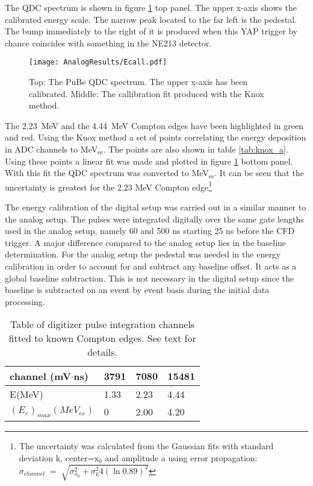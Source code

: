 \documentclass[main.tex]{subfiles}
\begin{document}
The QDC spectrum is shown in figure \ref{fig:qdc_a} top panel. The upper x-axis shows the calibrated energy scale. The narrow peak located to the far left is the pedestal. The bump immediately to the right of it is produced when this YAP trigger by chance coincides with something in the NE213 detector.
\begin{figure}[ht!]
    \centering
        \texttt{[image: AnalogResults/Ecall.pdf]}
        \caption[Energy calibration of the analog setup]{Top: The PuBe QDC spectrum. The upper x-axis has been calibrated. Middle: The callibration fit produced with the Knox method.}
    \label{fig:qdc_a}
\end{figure}

The \SI{2.23}{MeV} and the \SI{4.44}{MeV} Compton edges have been highlighted in green and red. Using the Knox method a set of points correlating the energy deposition in ADC channels to \si{\MeV}$_\text{ee}$. The points are also shown in table \ref{tab:knox_a}. Using these points a linear fit was made and plotted in figure \ref{fig:qdc_a} bottom panel. With this fit the QDC spectrum was converted to \si{\MeV}$_\text{ee}$. It can be seen that the uncertainty is greatest for the 2.23 \si{\MeV} Compton edge\footnote{The uncertainty was calculated from the Gaussian fits with standard deviation k, center=$\text{x}_\text{0}$ and amplitude a using error propagation: $\sigma_{channel}\;=\;\sqrt{\sigma_{x_0}^2 + \sigma_{k}^2 4\left(\ln0.89\right)^2 }$}

The energy calibration of the digital setup was carried out in a similar manner to the analog setup. The pulses were integrated digitally over the same gate lengths used in the analog setup, namely 60 and 500 ns starting 25 ns before the CFD trigger. A major difference compared to the analog setup lies in the baseline determination. For the analog setup the pedestal was needed in the energy calibration in order to account for and subtract any baseline offset. It acts as a global baseline subtraction. This is not necessary in the digital setup since the baseline is subtracted on an event by event basis during the initial data processing. 

\begin{table}[hb]
	\center
	\begin{tabular}{|l|l|l|l|}
	\hline
	channel (mV$\cdot$ns)            & 3791 & 7080  & 15481  \\
	\hline
	E(MeV)          & 1.33    & 2.23  & 4.44 \\
	\hline
	$(E_{e})_{max}(MeV_{ee})$ & 0    & 2.00  & 4.20 \\
	\hline
	\end{tabular}
   	\captionsetup{width=0.435\linewidth}
	\caption[Table of values used for energy calibration, digital setup.]{Table of digitizer pulse integration channels fitted to known Compton edges. See text for details.}
	\label{tab:knox_d}
\end{table}
\end{document}
